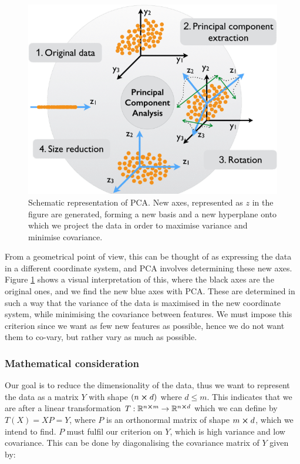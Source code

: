         \begin{figure}
            \includegraphics[width=\linewidth]{figs/pca_schematic.png}
            \caption{Schematic representation of PCA. New axes, represented as $z$ in the figure are generated, forming a new basis and a new hyperplane onto which we project the data in order to maximise variance and minimise covariance.\citep{pca_img}}
            \label{theo:fig:pca_schematic}
        \end{figure}
        
        From a geometrical point of view, this can be thought of as expressing the data in a different coordinate system, and PCA involves determining these new axes. Figure \ref{theo:fig:pca_schematic}  shows a visual interpretation of this, where the black axes are the original ones, and we find the new blue axes with PCA. These are determined in such a way that the variance of the data is maximised in the new coordinate system, while minimising the covariance between features. We must impose this criterion since we want as few new features as possible, hence we do not want them to co-vary, but rather vary as much as possible. 

    \subsubsection{Mathematical consideration}

    Our goal is to reduce the dimensionality of the data, thus we want to represent the data as a matrix $Y$ with shape $(n\cross d)$ where $d\leq m$. This indicates that we are after a linear transformation $T:\mathbb{R}^{n\cross m} \to \mathbb{R}^{n\cross d}$ which we can define by $T(X) = XP = Y$, where $P$ is an orthonormal matrix of shape $m\cross d$, which we intend to find. $P$ must fulfil our criterion on $Y$, which is high variance and low covariance. This can be done by diagonalising the covariance matrix of $Y$ given by:

